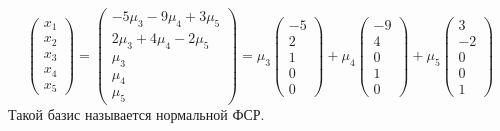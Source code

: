 \documentclass[a4paper, 12pt]{article}
\theoremstyle{definition}
\begin{document}
  $$\begin{pmatrix}
    x_1 \\ x_2 \\ \hline x_3 \\ x_4 \\ x_5
  \end{pmatrix} = \begin{pmatrix}
    -5\mu_3-9\mu_4+3\mu_5 \\ 2\mu_3 + 4\mu_4-2\mu_5 \\ \hline \mu_3 \\ \mu_4 \\ \mu_5
  \end{pmatrix} = \mu_3 \begin{pmatrix}
    -5 \\ 2 \\ \hline 1 \\ 0 \\ 0
  \end{pmatrix} + \mu_4 \begin{pmatrix}
    -9 \\ 4 \\ \hline 0 \\ 1 \\ 0
  \end{pmatrix} + \mu_5 \begin{pmatrix}
    3 \\ -2 \\ \hline 0 \\ 0 \\ 1 
  \end{pmatrix}$$ 
  Такой базис называется нормальной ФСР. 
\end{document}
